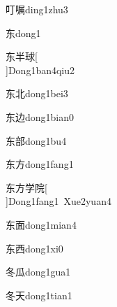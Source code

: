 \begin{verbete}[5;15]{叮嘱}{ding1zhu3}
\end{verbete}

\begin{verbete}[5]{东}{dong1}
\end{verbete}

\begin{verbete}[5;5;11]{东半球}[\\]{Dong1ban4qiu2}
\end{verbete}

\begin{verbete}[5;5]{东北}{dong1bei3}
\end{verbete}

\begin{verbete}[5;5]{东边}{dong1bian0}
\end{verbete}

\begin{verbete}[5;10]{东部}{dong1bu4}
\end{verbete}

\begin{verbete}[5;4]{东方}{dong1fang1}
\end{verbete}

\begin{verbete}[5;4;8;9]{东方学院}[\\]{Dong1fang1\ Xue2yuan4}
\end{verbete}

\begin{verbete}[5;9]{东面}{dong1mian4}
\end{verbete}

\begin{verbete}[5;6]{东西}{dong1xi0}
\end{verbete}

\begin{verbete}[5;5]{冬瓜}{dong1gua1}
\end{verbete}

\begin{verbete}[5;4]{冬天}{dong1tian1}
\end{verbete}

